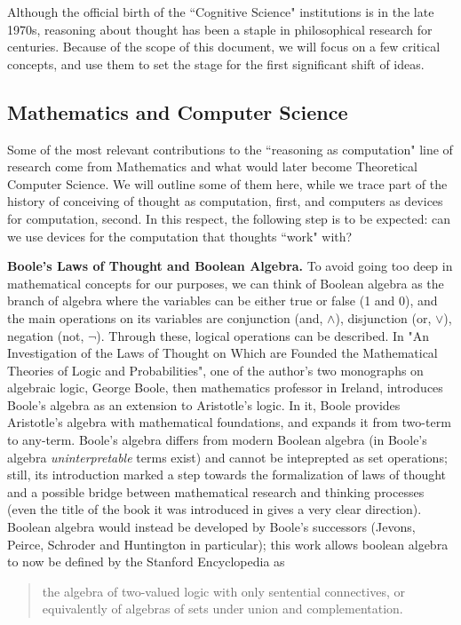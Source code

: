 \documentclass[../main.tex]{subfiles}
\begin{document}
Although the official birth of the ``Cognitive Science" institutions is in the late 1970s, reasoning about thought has been a staple in philosophical research for centuries. Because of the scope of this document, we will focus on a few critical concepts, and use them to set the stage for the first significant shift of ideas.

\subsection{Mathematics and Computer Science}
Some of the most relevant contributions to the ``reasoning as computation" line of research come from Mathematics and what would later become Theoretical Computer Science. We will outline some of them here, while we trace part of the history of conceiving of thought as computation, first, and computers as devices for computation, second. In this respect, the following step is to be expected: can we use devices for the computation that thoughts ``work" with?


\vspace{4pt}
\textbf{Boole's Laws of Thought and Boolean Algebra.}
To avoid going too deep in mathematical concepts for our purposes, we can think of Boolean algebra as the branch of algebra where the variables can be either true or false (1 and 0), and the main operations on its variables are conjunction (and, $\wedge$), disjunction (or, $\vee$), negation (not, $\neg$). Through these, logical operations can be described.
In "An Investigation of the Laws of Thought on Which are Founded the Mathematical Theories of Logic and Probabilities", one of the author's two monographs on algebraic logic, George Boole, then mathematics professor in Ireland, introduces Boole's algebra as an extension to Aristotle's logic. In it, Boole provides Aristotle's algebra with mathematical foundations, and expands it from two-term to any-term. Boole's algebra differs from modern Boolean algebra (in Boole's algebra \textit{uninterpretable} terms exist) and cannot be inteprepted as set operations; still, its introduction marked a step towards the formalization of laws of thought and a possible bridge between mathematical research and thinking processes (even the title of the book it was introduced in gives a very clear direction). Boolean algebra would instead be developed by Boole's successors (Jevons, Peirce, Schroder and Huntington in particular); this work allows boolean algebra to now be defined by the Stanford Encyclopedia as
\begin{quote}
    the algebra of two-valued logic with only sentential connectives, or equivalently of algebras of sets under union and complementation.
\end{quote}
\end{document}
